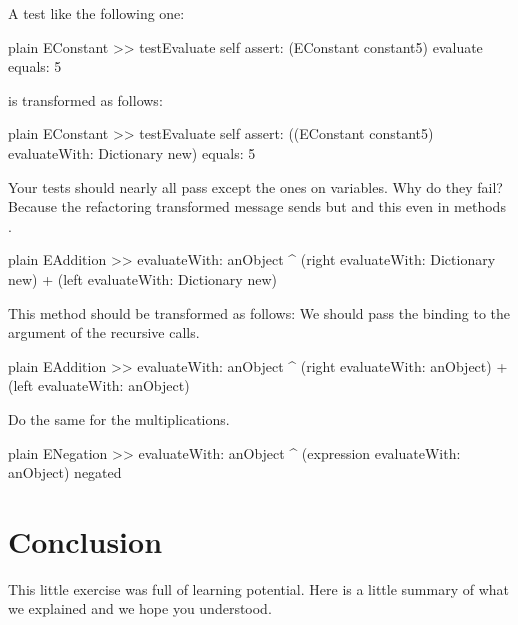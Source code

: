 \documentclass[10pt,twoside,english]{_support/latex/sbabook/sbabook}
\begin{document}
A test like the following one: 

\begin{displaycode}{plain}
EConstant >> testEvaluate 
	self assert: (EConstant constant5) evaluate equals: 5
\end{displaycode}

is transformed as follows: 

\begin{displaycode}{plain}
EConstant >> testEvaluate
	self assert: ((EConstant constant5) evaluateWith: Dictionary new) equals: 5
\end{displaycode}

Your tests should nearly all pass except the ones on variables. Why do they fail?
Because the refactoring transformed message sends  but  and this even in methods . 

\begin{displaycode}{plain}
EAddition >> evaluateWith: anObject
	^ (right evaluateWith: Dictionary new) + (left evaluateWith: Dictionary new)
\end{displaycode}

This method should be transformed as follows: We should pass the binding to the argument of the  recursive calls.

\begin{displaycode}{plain}
EAddition >> evaluateWith: anObject
	^ (right evaluateWith: anObject) + (left evaluateWith: anObject)
\end{displaycode}

Do the same for the multiplications.

\begin{displaycode}{plain}
ENegation >> evaluateWith: anObject
	^ (expression evaluateWith: anObject) negated
\end{displaycode}
\section{Conclusion}
This little exercise was full of learning potential. Here is a little summary of what we explained and we hope you understood. 
\end{document}
